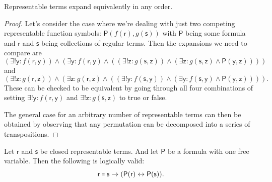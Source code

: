 \documentclass{article}
\theoremstyle{customstyle}
\newenvironment{prf}{\begin{mdframed}[skipabove=5pt, backgroundcolor=Gray!10, topline=false, bottomline=false, leftline=false, rightline=false]\begin{proof}}{\end{proof}\end{mdframed}}
\newcommand{\fm}[1]{\mathsf{#1}}
\newcommand{\fmeq}{\mathrel{\resizebox{1.15\height}{1.15\height}{=}}}
\begin{document}
\begin{lemma}
  Representable terms expand equivalently in any order.
\end{lemma}

\begin{prf}
  Let's consider the case where we're dealing with just two competing representable function symbols: $\fm{P}(f(\bm{\fm{r}}), g(\bm{\fm{s}}))$ with $\fm{P}$ being some formula and $\bm{\fm{r}}$ and $\bm{\fm{s}}$ being collections of regular terms. Then the expansions we need to compare are
  \[
    (\exists! \fm{y} \colon f(\bm{\fm{r}}, \fm{y})) \land (\exists \fm{y} \colon f(\bm{\fm{r}}, \fm{y}) \land ((\exists! \fm{z} \colon g(\bm{\fm{s}}, \fm{z})) \land (\exists \fm{z} \colon g(\bm{\fm{s}}, \fm{z}) \land \fm{P}(\fm{y}, \fm{z}))))\phantom{.}
  \]
  and
  \[
    (\exists! \fm{z} \colon g(\bm{\fm{r}}, \fm{z})) \land (\exists \fm{z} \colon g(\bm{\fm{r}}, \fm{z}) \land ((\exists! \fm{y} \colon f(\bm{\fm{s}}, \fm{y})) \land (\exists \fm{y} \colon f(\bm{\fm{s}}, \fm{y}) \land \fm{P}(\fm{y}, \fm{z})))).
  \]
  These can be checked to be equivalent by going through all four combinations of setting $\exists! \fm{y} \colon f(\bm{\fm{r}}, \fm{y})$ and $\exists! \fm{z} \colon g(\bm{\fm{s}}, \fm{z})$ to true or false.

  The general case for an arbitrary number of representable terms can then be obtained by observing that any permutation can be decomposed into a series of transpositions.
\end{prf}

\begin{lemma}\label{lm-leibniz}
  Let $\fm{r}$ and $\fm{s}$ be closed representable terms. And let $\fm{P}$ be a formula with one free variable. Then the following is logically valid:
  \[
    \fm{r} \fmeq \fm{s} \rightarrow (\fm{P}(\fm{r}) \leftrightarrow \fm{P}(\fm{s})).
  \]
\end{lemma}
\end{document}
